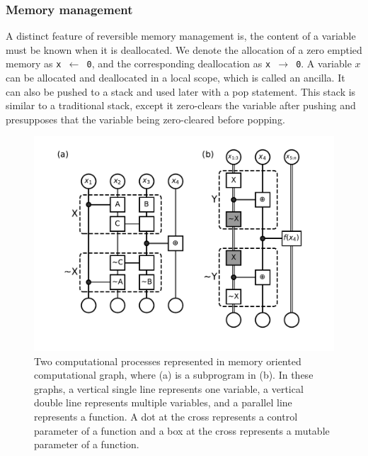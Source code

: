 \documentclass{article}
\newcommand{\<}{\langle}
\renewcommand{\>}{\rangle}
\theoremstyle{definition}\newtheorem{definition}{\textit{Definition}}
\begin{document}
\subsubsection{Memory management}
    A distinct feature of reversible memory management is, the content of a variable must be known when it is deallocated.
    We denote the allocation of a zero emptied memory as \texttt{x $\leftarrow$ 0}, and the corresponding deallocation as \texttt{x $\rightarrow$ 0}.
    A variable $x$ can be allocated and deallocated in a local scope, which is called an ancilla.
    It can also be pushed to a stack and used later with a pop statement.
    This stack is similar to a traditional stack, except it zero-clears the variable after pushing and presupposes that the variable being zero-cleared before popping.
\begin{figure}
    \centerline{\includegraphics[width=0.6\columnwidth,trim={0 1cm 0 0cm},clip]{fig6.pdf}}
    \caption{Two computational processes represented in memory oriented computational graph, where (a) is a subprogram in (b). In these graphs, a vertical single line represents one variable, a vertical double line represents multiple variables, and a parallel line represents a function. A dot at the cross represents a control parameter of a function and a box at the cross represents a mutable parameter of a function.
    }\label{fig:ccu}
\end{figure}
\end{document}
